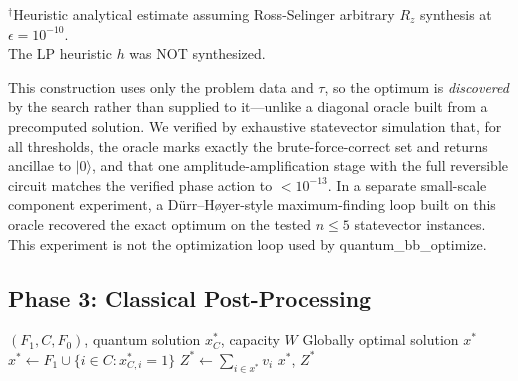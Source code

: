 \documentclass[conference]{IEEEtran}
\begin{document}
\begin{table}[htbp]
\caption{Exact Logical Predicate Resources and Analytical T-Count Estimates}
\label{tab:oracle}
\begin{center}
\begin{flushleft}
\footnotesize
$^\dagger$Heuristic analytical estimate assuming Ross-Selinger arbitrary $R_z$ synthesis at $\epsilon = 10^{-10}$.\\
The LP heuristic $h$ was NOT synthesized.
\end{flushleft}
\end{center}
\end{table}

This construction uses only the problem data and $\tau$, so the optimum is \textit{discovered} by the search rather than supplied to it---unlike a diagonal oracle built from a precomputed solution. We verified by exhaustive statevector simulation that, for all thresholds, the oracle marks exactly the brute-force-correct set and returns ancillae to $|0\rangle$, and that one amplitude-amplification stage with the full reversible circuit matches the verified phase action to $<10^{-13}$. In a separate small-scale component experiment, a D\"urr--H{\o}yer-style maximum-finding loop built on this oracle recovered the exact optimum on the tested $n \le 5$ statevector instances. This experiment is not the optimization loop used by quantum\_bb\_optimize.

\subsection{Phase 3: Classical Post-Processing}

\begin{algorithm}[h]
\caption{Classical Reconstruction}
\label{alg:postprocess}
\begin{algorithmic}[1]
\REQUIRE $(F_1, C, F_0)$, quantum solution $x^*_C$, capacity $W$
\ENSURE Globally optimal solution $x^*$
\STATE $x^* \leftarrow F_1 \cup \{i \in C : x^*_{C,i} = 1\}$
\STATE $Z^* \leftarrow \sum_{i \in x^*} v_i$
\RETURN $x^*$, $Z^*$
\end{algorithmic}
\end{algorithm}
\end{document}

